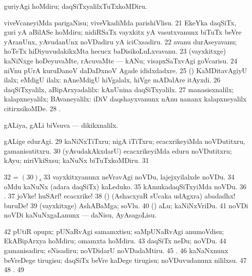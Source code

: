 { guriyAgi hoMdiru; daqSiTxyalilxTuTxkoMDiru. 

 viveVcaneyiMda parigaNisu; viveVkadiMda parishiVlisu. 
\num{21}  EkeYka daqSiTx, guri yA aBilASe hoMdiru; nidiRSaTx vayxkitx yA vasutxvanunx biTuTx beVre yAranUnx, yAvudanUnx noVDadiru yA iciCxsadiru. 
\num{22}  avanu durAseyavanu; hoTeTx hiDiyuvudakikxMta hecucx baDisikoLuLxvavanu. 
\num{23}  (vayxkitxge) kaNiNxge hoDeyuvaMte, rAcuvaMte --- kANu; visapxSaTxvAgi goVcarisu. 
\num{24}  niVnu pUrA kuruDanoV daDaDxnoV Agade ididxdadxre. 
\num{25}  (\ashi) KaMDitavAgiyU ilalx; eMdigU ilalx:  nAneMdigU hiVgalalx, hiVge mADalAre itAyxdi. 
\num{26}  daqSiTxyalilx, aBipArxyadalilx:  kAnUnina daqSiTxyalilx. 
\num{27}  manasisxnalilx; kalapxneyalilx; BAvaneyalilx:  iDiV daqshayxvanunx nAnu nananx kalapxneyalilx citirxsikoMDe. 
\num{28} . 

 gALiya, gALi biVsuva --- dikikxnalilx. 

 gALige edurAgi. 
\num{29}  kaNiNxTiTxru; nigA iTiTxru; ecacxrikeyiMda noVDutitxru, gamanisutitxru. 
\hypertarget{eye1 nuga30}{}
\num{30}  (yAvudakAkxdarU) ecacxrikeyiMda eduru noVDutitxru; kAyu; niriVkiSxsu; kaNuNx biTuTxkoMDiru. 
\num{31}  
\num{32}  = \hyperlink{eye1 nuga30}{\nuga $(30)$.} 
\num{33}  vayxkitxyanunx neVravAgi noVDu, lajejxyilalxde noVDu. 
\num{34}  oMdu kaNuNx (adara daqSiTx) kaLeduko. 
\num{35}  kAmukadaqSiTxyiMda noVDu. 
\num{36} .  
\num{37}  joVke! huSArf! ecacxrike! 
\num{38}  (\ashi) (AshacxyaR sUcaka udAgxra) abadadhx! buruDe! 
\num{39}  (vayxkitxge) AshABaMga; soVlu. 
\num{40}  (\tu) aLu; kaNiNxVriDu. 
\num{41}  noVDi noVDi kaNuNxgaLanunx --- daNisu, AyAsagoLisu. 
\num{42}  pUtiR opupx; pUNaRvAgi samamxtisu; saMpUNaRvAgi anumoVdisu; EkABipArxya hoMdiru; omamxta hoMdiru. 
\num{43}  daqSiTx neDu; noVDu. 
\num{44}  gamanisadiru; eNisadiru; noVDidarU
noVDadaMtiru.  
\num{45} 
.  
\num{46}  kaNaNxnunx beVreDege tirugisu; daqSiTx beVre kaDege tirugisu; noVDuvudanunx nililxsu. 
\num{47}  
\num{48} . 
\num{49}  

}
